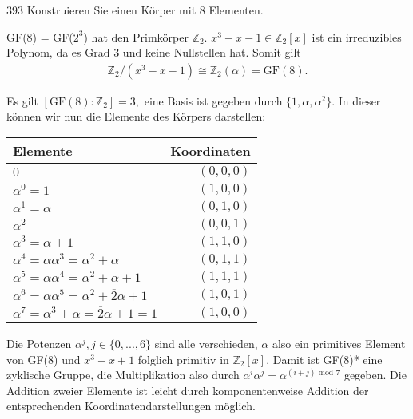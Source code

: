 \begin{algebraUE}{393}
  Konstruieren Sie einen Körper mit 8 Elementen.
\end{algebraUE}

\begin{solution}

  GF(8) = GF($2^3$) hat den Primkörper $\mathbb{Z}_2.$ $x^3-x-1 \in \mathbb{Z}_2[x]$ ist ein irreduzibles Polynom, da es Grad 3 und keine Nullstellen hat. Somit gilt
  \begin{align}
      \mathbb{Z}_2/(x^3-x-1) \cong \mathbb{Z}_2(\alpha) = \text{GF}(8).
  \end{align}

  Es gilt $[\text{GF}(8) : \mathbb{Z}_2] = 3,$ eine Basis ist gegeben durch $\{1, \alpha, \alpha^2\}.$ In dieser können wir nun die Elemente des Körpers darstellen:
  \begin{center}
  \begin{tabular}[h]{l|r}
  Elemente & Koordinaten \\
  \hline
  $0$ & $(0, 0, 0)$ \\
  $\alpha^0 = 1$ & $(1, 0, 0)$ \\
  $\alpha^1 = \alpha$ & $(0, 1, 0)$ \\
  $\alpha^2$ & $(0, 0, 1)$ \\
  $\alpha^3 = \alpha + 1$ & $(1, 1, 0)$ \\
  $\alpha^4 = \alpha\alpha^3 = \alpha^2 + \alpha$ & $(0, 1, 1)$ \\
  $\alpha^5 = \alpha\alpha^4 = \alpha^2 + \alpha + 1$ & $(1, 1, 1)$ \\
  $\alpha^6 = \alpha\alpha^5 = \alpha^2 + \overline2\alpha + 1$ & $(1, 0, 1)$ \\
  $\alpha^7 = \alpha^3 + \alpha = \overline2\alpha + 1 = 1$ & $(1, 0, 0)$
  \end{tabular}
  \end{center}

  Die Potenzen $\alpha^j, j \in \{0, ..., 6\}$ sind alle verschieden, $\alpha$ also ein primitives Element von GF(8) und $x^3 - x + 1$ folglich primitiv in $\mathbb{Z}_2[x].$ Damit ist GF(8)* eine zyklische Gruppe, die Multiplikation also durch $\alpha^i \alpha^j = \alpha^{(i+j) \text{~mod~} 7}$ gegeben. Die Addition zweier Elemente ist leicht durch komponentenweise Addition der entsprechenden Koordinatendarstellungen möglich.

\end{solution}
